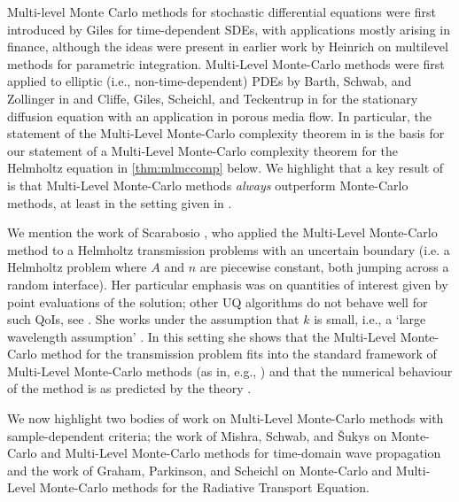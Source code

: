 Multi-level Monte Carlo methods for stochastic differential equations were first introduced by Giles \cite{Gi:08} for time-dependent SDEs, with applications mostly arising in finance, although the ideas were present in earlier work by Heinrich \cite{He:98,He:01} on multilevel methods for parametric integration. Multi-Level Monte-Carlo methods were first applied to elliptic (i.e., non-time-dependent) PDEs by Barth, Schwab, and Zollinger in \cite{BaScZo:11} and Cliffe, Giles, Scheichl, and Teckentrup in \cite{ClGiScTe:11} for the stationary diffusion equation with an application in porous media flow. In particular, the statement of the Multi-Level Monte-Carlo complexity theorem in \cite[Theorem 1]{ClGiScTe:11} is the basis for our statement of a Multi-Level Monte-Carlo complexity theorem for the Helmholtz equation in \cref{thm:mlmccomp} below. We highlight that a key result of \cite[Theorem 1]{ClGiScTe:11} is that Multi-Level Monte-Carlo methods \emph{always} outperform Monte-Carlo methods, at least in the setting given in \cite{ClGiScTe:11}.

We mention the work of Scarabosio \cite{Sc:17}, who applied the Multi-Level Monte-Carlo method to a Helmholtz transmission problems with an uncertain boundary (i.e. a Helmholtz problem where $A$ and $n$ are piecewise constant, both jumping across a random interface). Her particular emphasis was on quantities of interest given by point evaluations of the solution; other UQ algorithms do not behave well for such QoIs, see \cite[Section 3.3]{Sc:17}. She works under the assumption that $k$ is small, i.e., a `large wavelength assumption' \cite[Assumption 3.1]{Sc:17}.  In this setting she shows that the Multi-Level Monte-Carlo method for the transmission problem fits into the standard framework of Multi-Level Monte-Carlo methods \cite[Proposition 4.2]{Sc:17} (as in, e.g., \cite{ClGiScTe:11,Gi:15}) and that the numerical behaviour of the method is as predicted by the theory \cite[Section 6]{Sc:17}.

We now highlight two bodies of work on Multi-Level Monte-Carlo methods with sample-dependent criteria; the work of Mishra, Schwab, and \v{S}ukys on Monte-Carlo and Multi-Level Monte-Carlo methods for time-domain wave propagation and the work of Graham, Parkinson, and Scheichl on Monte-Carlo and Multi-Level Monte-Carlo methods for the Radiative Transport Equation.

